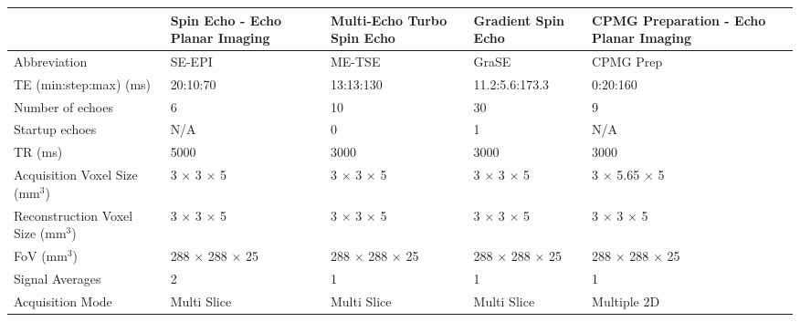 \begin{table}[H]
	\centering
	\begin{adjustbox}{width=1.0\textwidth, center}
	\begin{tabularx}{1.25\textwidth}{X|X|X|X|X}
		                                                     & Spin Echo - Echo Planar Imaging & Multi-Echo Turbo Spin Echo & Gradient Spin Echo & CPMG \ttwo Preparation - Echo Planar Imaging \\ \hline
		Abbreviation                                         & SE-EPI                          & ME-TSE                     & GraSE              & CPMG \ttwo Prep     \\ \hline
		TE (min:step:max) (ms)                               & 20:10:70                        & 13:13:130                  & 11.2:5.6:173.3     & 0:20:160            \\ \hline
		Number of   echoes                                   & 6                               & 10                         & 30                 & 9                   \\ \hline
		Startup echoes                                       & N/A                             & 0                          & 1                  & N/A                 \\ \hline
		TR (ms)                                              & 5000                            & 3000                       & 3000               & 3000                \\ \hline
		Acquisition Voxel Size   (mm$^3$)                    & 3 $\times$ 3 $\times$ 5         & 3 $\times$ 3 $\times$ 5    &3 $\times$ 3 $\times$ 5 &3 $\times$ 5.65 $\times$ 5\\ \hline
		Reconstruction Voxel Size   (mm$^3$)                 & 3 $\times$ 3 $\times$ 5         & 3 $\times$ 3 $\times$ 5    &3 $\times$ 3 $\times$ 5 &3 $\times$ 3 $\times$ 5\\ \hline
		FoV (mm$^3$)                                         & 288 $\times$ 288 $\times$ 25    & 288 $\times$ 288 $\times$ 25&288 $\times$ 288 $\times$ 25&288 $\times$ 288 $\times$ 25\\ \hline
		Signal   Averages                                    & 2                               & 1                          & 1                  & 1                   \\ \hline
		Acquisition Mode                                     & Multi Slice                     & Multi Slice                & Multi Slice        & Multiple 2D         \\ \hline

\end{tabularx}
\end{adjustbox}
\end{table}
